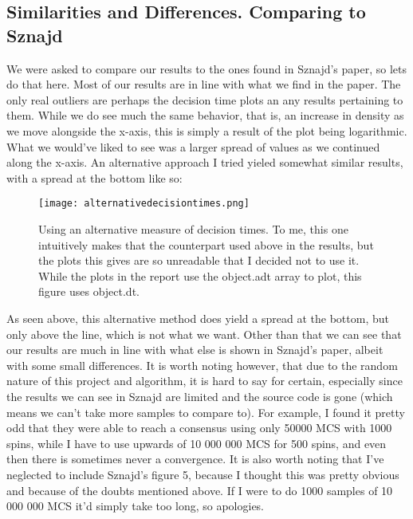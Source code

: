 \documentclass{article}
\begin{document}
\subsection{Similarities and Differences. Comparing to Sznajd}
We were asked to compare our results to the ones found in Sznajd's paper, so lets do that here. \newline
Most of our results are in line with what we find in the paper. The only real outliers are perhaps the decision time plots an any results pertaining to them. While we do see much the same behavior, that is, an increase in density as we move alongside the x-axis, this is simply a result of the plot being logarithmic. What we would've liked to see was a larger spread of values as we continued along the x-axis. An alternative approach I tried yieled somewhat similar results, with a spread at the bottom like so:
\begin{figure}[ht!]
    \centering
    \texttt{[image: alternativedecisiontimes.png]}
    \caption{Using an alternative measure of decision times. \newline
    To me, this one intuitively makes that the counterpart used above in the results, but the plots this gives are so unreadable that I decided not to use it. \newline
    While the plots in the report use the object.adt array to plot, this figure uses object.dt.}
    \label{fig7}
\end{figure} \newline
As seen above, this alternative method does yield a spread at the bottom, but only above the line, which is not what we want. \newline
Other than that we can see that our results are much in line with what else is shown in Sznajd's paper, albeit with some small differences. It is worth noting however, that due to the random nature of this project and algorithm, it is hard to say for certain, especially since the results we can see in Sznajd are limited and the source code is gone (which means we can't take more samples to compare to). \newline
For example, I found it pretty odd that they were able to reach a consensus using only 50000 MCS with 1000 spins, while I have to use upwards of 10 000 000 MCS for 500 spins, and even then there is sometimes never a convergence. \newline
It is also worth noting that I've neglected to include Sznajd's figure 5, because I thought this was pretty obvious and because of the doubts mentioned above. If I were to do 1000 samples of 10 000 000 MCS it'd simply take too long, so apologies.
\end{document}
